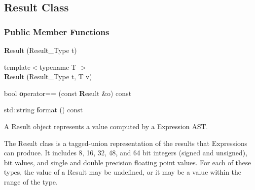 \subsection{Result Class}
\label{classDyninst_1_1InstructionAPI_1_1Result}
\subsubsection*{Public Member Functions}
\begin{DoxyCompactItemize}
\item 
{\textbf Result} (Result\_\-Type t)
\item 
{\footnotesize template$<$typename T $>$ }\\{\textbf Result} (Result\_\-Type t, T v)
\item 
bool {\textbf operator==} (const {\textbf Result} \&o) const 
\item 
std::string {\textbf format} () const 
\end{DoxyCompactItemize}



A Result object represents a value computed by a Expression AST.

The Result class is a tagged-\/union representation of the results that Expressions can produce. It includes 8, 16, 32, 48, and 64 bit integers (signed and unsigned), bit values, and single and double precision floating point values. For each of these types, the value of a Result may be undefined, or it may be a value within the range of the type.

